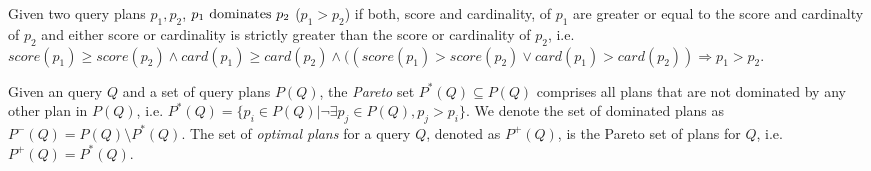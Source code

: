 \begin{definition}[Dominance]
  Given two query plans $p_1,p_2$, $p_1 \mbox{ \textnormal{dominates}
  } p_2$ ($p_1 > p_2$) if both, score and cardinality, of $p_1$ are greater or equal
  to the score and cardinalty of $p_2$ and either score or
  cardinality is strictly greater than the score or cardinality of
  $p_2$, i.e. $score(p_1) \geq score(p_2) \wedge card(p_1) \geq
  card(p_2) \wedge ((score(p_1) > score(p_2) \vee card(p_1) >
  card(p_2)) \Rightarrow p_1 > p_2$.
\end{definition}


\begin{definition}
  Given an query $Q$ and a set of query plans $P(Q)$, the \emph{Pareto}
  set $P^*(Q) \subseteq P(Q)$ comprises all plans that are not
  dominated by any other plan in $P(Q)$, i.e. $P^*(Q) = \{p_i \in P(Q) | \neg\exists p_j\in P(Q), p_j  > p_i\}$. We denote the set of
  dominated plans as $P^-(Q) = P(Q) \setminus P^*(Q)$. The set of \emph{optimal plans} for a query $Q$, denoted as $P^+(Q)$, is the Pareto set of plans for $Q$, i.e. $P^+(Q) = P^*(Q)$.
\end{definition}

